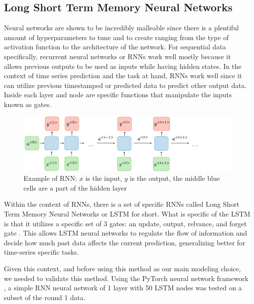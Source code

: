 \documentclass[sigconf,nonacm]{acmart}
\begin{document}
\subsection{Long Short Term Memory Neural Networks}

Neural networks are shown to be incredibly malleable since there is a plentiful
amount of hyperparameters to tune and to create ranging from the type of
activation function to the architecture of the network. For sequential data
specifically, recurrent neural networks or RNNs work well mostly because it
allows previous outputs to be used as inputs while having hidden states.  
In the context of time series prediction and the task at hand, RNNs work well
since it can utilize previous timestamped or predicted data to predict other
output data. Inside each layer and node are specific functions that manipulate
the inputs known as gates.

\begin{figure}
  \centering
  \includegraphics[width=\linewidth]{figures/architecture-rnn-ltr.png}
  \caption{Example of RNN: $x$ is the input, $y$ is the output, the middle blue
  cells are a part of the hidden layer}
  \label{fig:rnn}
\end{figure}

Within the context of RNNs, there is a set of specific RNNs called Long Short
Term Memory Neural Networks or LSTM for short. What is specific of the LSTM is
that it utilizes a specific set of 3 gates: an update, output, relvance, and
forget gate \cite{LSTMlecture}. This allows LSTM neural networks to regulate
the flow of information and decide how much past data affects the current
prediction, generalizing better for time-series specific tasks.

Given this context, and before using this method as our main modeling choice,
we needed to validate this method. Using the PyTorch neural network framework
\cite{Pytorch}, a simple RNN neural network of 1 layer with 50 LSTM nodes was
tested on a subset of the round 1 data. 
\end{document}
